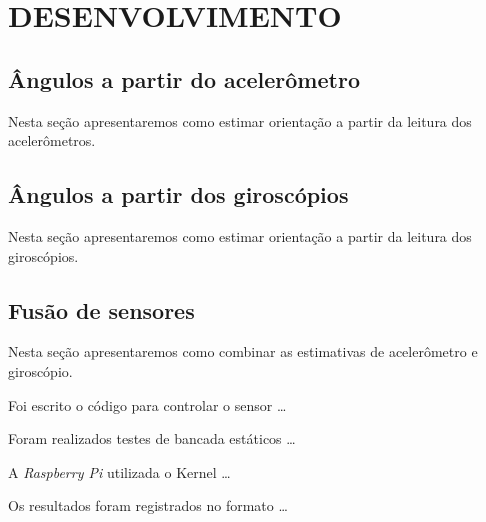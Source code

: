 \chapter{DESENVOLVIMENTO}\label{chap:desenvolvimento}

\section{Ângulos a partir do acelerômetro}

Nesta seção apresentaremos como estimar orientação a partir da leitura dos acelerômetros.

\section{Ângulos a partir dos giroscópios}

Nesta seção apresentaremos como estimar orientação a partir da leitura dos giroscópios.

\section{Fusão de sensores}

Nesta seção apresentaremos como combinar as estimativas de acelerômetro e giroscópio.

Foi escrito o código para controlar o sensor \ldots

Foram realizados testes de bancada estáticos \ldots

A \emph{Raspberry Pi} utilizada o Kernel \ldots

Os resultados foram registrados no formato \ldots
